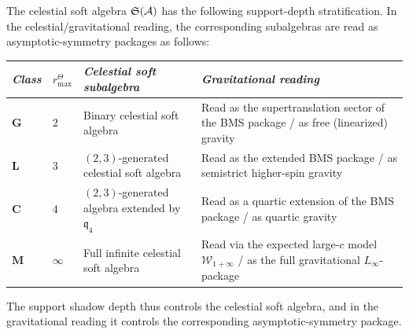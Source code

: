 \begin{proposition}
The celestial soft algebra $\mathfrak{S}(\mathcal{A})$ has the following
support-depth stratification. In the celestial/gravitational reading,
the corresponding subalgebras are read as asymptotic-symmetry
packages as follows:
\begin{center}
\small
\renewcommand{\arraystretch}{1.15}
\begin{tabular}{llll}
\toprule
\emph{Class} &
\(r^\Theta_{\max}\) &
\emph{Celestial soft subalgebra} &
\emph{Gravitational reading} \\
\midrule
$\mathbf{G}$ &
 $2$ &
 Binary celestial soft algebra &
 Read as the supertranslation sector of the BMS package / as free (linearized) gravity \\
$\mathbf{L}$ &
 $3$ &
 $(2,3)$-generated celestial soft algebra &
 Read as the extended BMS package / as semistrict higher-spin gravity \\
$\mathbf{C}$ &
 $4$ &
 $(2,3)$-generated algebra extended by $\mathfrak{q}_4$ &
 Read as a quartic extension of the BMS package / as quartic gravity \\
$\mathbf{M}$ &
 $\infty$ &
 Full infinite celestial soft algebra &
 Read via the expected large-$c$ model $\mathcal{W}_{1+\infty}$ / as the full gravitational $L_\infty$-package \\
\bottomrule
\end{tabular}
\end{center}
The support shadow depth thus controls the celestial soft algebra, and in the
gravitational reading it controls the corresponding asymptotic-symmetry
package.
\end{proposition}

